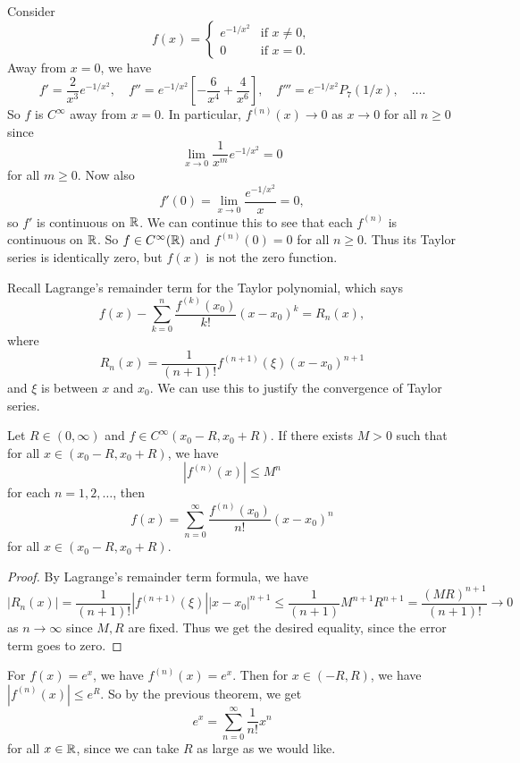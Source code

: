 \begin{example}
  Consider
  \[
    f(x) =
    \begin{cases}
      e^{-1/x^2} & \text{if } x \ne 0, \\
      0 & \text{if } x = 0.
    \end{cases}
  \]
  Away from $x = 0$, we have
  \[
    f' = \frac{2}{x^3} e^{-1/x^2}, \quad
    f'' = e^{-1 / x^2} \left[-\frac{6}{x^4} + \frac{4}{x^6}\right], \quad
    f''' = e^{-1 / x^2} P_7(1 / x), \quad \dots.
  \]
  So $f$ is $C^\infty$ away from $x = 0$.
  In particular, $f^{(n)}(x) \to 0$ as $x \to 0$
  for all $n \ge 0$ since
  \[
    \lim_{x \to 0} \frac{1}{x^m} e^{-1 / x^2} = 0
  \]
  for all $m \ge 0$. Now also
  \[
    f'(0) = \lim_{x \to 0} \frac{e^{-1/x^2}}{x} = 0,
  \]
  so $f'$ is continuous on $\mathbb{R}$. We can continue
  this to see that each $f^{(n)}$ is continuous on $\mathbb{R}$.
  So $f \in C^\infty(\mathbb{R})$ and
  $f^{(n)}(0) = 0$ for all $n \ge 0$. Thus its Taylor
  series is identically zero, but $f(x)$ is not the
  zero function.
\end{example}

\begin{remark}
Recall Lagrange's remainder term for the Taylor
polynomial, which says
\[
  f(x) - \sum_{k = 0}^n \frac{f^{(k)}(x_0)}{k!} (x - x_0)^k
  = R_n(x),
\]
where
\[
  R_n(x) = \frac{1}{(n + 1)!} f^{(n + 1)}(\xi) (x - x_0)^{n + 1}
\]
and $\xi$ is between $x$ and $x_0$. We can use this
to justify the convergence of Taylor series.
\end{remark}

\begin{theorem}
  Let $R \in (0, \infty)$ and $f \in C^\infty(x_0 - R, x_0 + R)$.
  If there exists $M > 0$ such that for all
  $x \in (x_0 - R, x_0 + R)$, we have
  \[
    |f^{(n)}(x)| \le M^n
  \]
  for each $n = 1, 2, \dots$, then
  \[
    f(x) = \sum_{n = 0}^\infty \frac{f^{(n)}(x_0)}{n!} (x - x_0)^n
  \]
  for all $x \in (x_0 - R, x_0 + R)$.
\end{theorem}

\begin{proof}
  By Lagrange's remainder term formula, we have
  \[
    |R_n(x)|
    = \frac{1}{(n + 1)!} |f^{(n + 1)}(\xi)| |x - x_0|^{n + 1}
    \le \frac{1}{(n + 1)} M^{n + 1} R^{n + 1}
    = \frac{(MR)^{n + 1}}{(n + 1)!} \to 0
  \]
  as $n \to \infty$ since $M, R$ are fixed. Thus we
  get the desired equality, since the error term goes
  to zero.
\end{proof}

\begin{example}
  For $f(x) = e^x$, we have $f^{(n)}(x) = e^x$. Then
  for $x \in (-R, R)$, we have $|f^{(n)}(x)| \le e^R$.
  So by the previous theorem, we get
  \[
    e^x = \sum_{n = 0}^\infty \frac{1}{n!} x^n
  \]
  for all $x \in \mathbb{R}$, since we can take $R$ as large as
  we would like.
\end{example}

